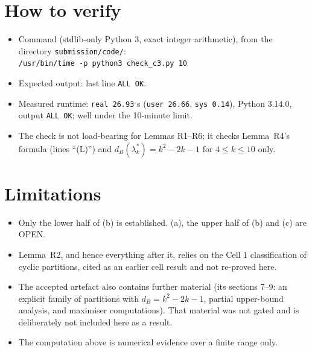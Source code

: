 \documentclass[11pt]{article}
\theoremstyle{remark}
\begin{document}
\section*{How to verify}

\begin{itemize}
\item Command (stdlib-only Python 3, exact integer arithmetic), from the directory \texttt{submission/code/}:\\
\texttt{/usr/bin/time -p python3 check\_c3.py 10}
\item Expected output: last line \texttt{ALL OK}.
\item Measured runtime: \texttt{real 26.93} s (\texttt{user 26.66}, \texttt{sys 0.14}), Python 3.14.0,\\ output \texttt{ALL OK}; well under the 10-minute limit.
\item The check is not load-bearing for Lemmas R1--R6; it checks Lemma~R4's formula (lines ``(L)'') and
$d_B(\lambda^*_k)=k^2-2k-1$ for $4\le k\le 10$ only.
\end{itemize}

\section*{Limitations}

\begin{itemize}
\item Only the lower half of (b) is established. (a), the upper half of (b) and (c) are OPEN.
\item Lemma~R2, and hence everything after it, relies on the Cell 1 classification of cyclic partitions, cited as
an earlier cell result and not re-proved here.
\item The accepted artefact also contains further material (its sections 7--9: an explicit family of partitions
with $d_B=k^2-2k-1$, partial upper-bound analysis, and maximiser computations). That material was not gated and is
deliberately not included here as a result.
\item The computation above is numerical evidence over a finite range only.
\end{itemize}
\end{document}
